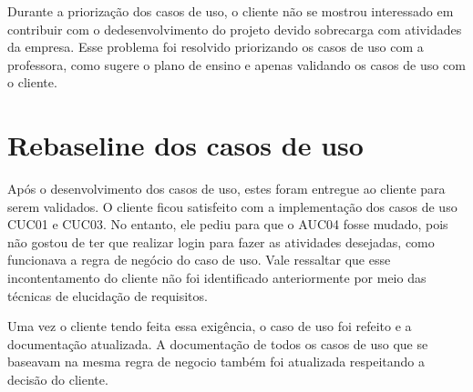 Durante a priorização dos casos de uso, o cliente não se mostrou interessado em contribuir com o dedesenvolvimento do projeto devido sobrecarga com atividades da empresa. Esse problema foi resolvido priorizando os casos de uso com a professora, como sugere o plano de ensino e apenas validando os casos de uso com o cliente.

\section{Rebaseline dos casos de uso}

Após o desenvolvimento dos casos de uso, estes foram entregue ao cliente para serem validados. O cliente ficou satisfeito com a implementação dos casos de uso CUC01 e CUC03. No entanto, ele pediu para que o AUC04 fosse mudado, pois não gostou de ter que realizar login para fazer as atividades desejadas, como funcionava a regra de negócio do caso de uso. Vale ressaltar que esse incontentamento do cliente não foi identificado anteriormente por meio das técnicas de elucidação de requisitos.

Uma vez o cliente tendo feita essa exigência, o caso de uso foi refeito e a documentação atualizada. A documentação de todos os casos de uso que se baseavam na mesma regra de negocio também foi atualizada respeitando a decisão do cliente.
